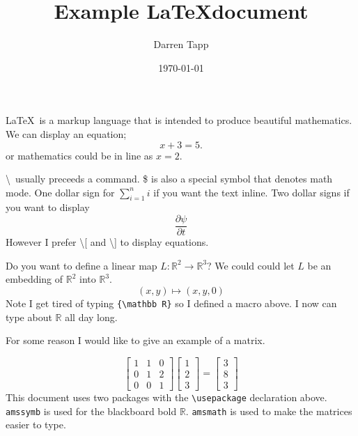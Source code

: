 \documentclass{article}
\title{Example \LaTeX document}
\author{Darren Tapp}
\date{\today}
\newcommand{\RR}{{\mathbb R}}
\begin{document}
\maketitle
\LaTeX\  is a markup language that is intended to produce beautiful
mathematics.  We can display an equation;
\[
x+3 = 5.
\]
or mathematics could be in line as $x=2$.

\textbackslash\ usually preceeds a command.  \$ is also a special symbol that
denotes math mode.  One dollar sign for $\sum_{i=1}^n i$ if you want
the text inline.  Two dollar signs if you want to display
$$
\frac{\partial \psi }{\partial t}
$$
However I prefer \textbackslash [ and \textbackslash ] to display equations.

Do you want to define a linear map $L:{\mathbb R}^2\to {\mathbb R}^3$?  We could
could let $L$ be an embedding of ${\mathbb R}^2$ into ${\mathbb R}^3$.
\[
(x,y) \mapsto (x,y,0)
\]
Note I get tired of typing \verb|{\mathbb R}| so I defined a macro above.  I
now can type about $\RR$ all day long.

For some reason I would like to give an example of a matrix.

\[
\begin{bmatrix}
1& 1& 0 \\
0& 1 & 2 \\
0 & 0 & 1
\end{bmatrix}
\begin{bmatrix}
1 \\
2 \\
3
\end{bmatrix}
=
\begin{bmatrix}
3 \\
8 \\
3
\end{bmatrix}
\]
This document uses two packages with the \verb|\usepackage| declaration above.
\verb|amssymb| is used for the blackboard bold $\RR$.  \verb|amsmath| is used
to make the matrices easier to type.
\end{document}
